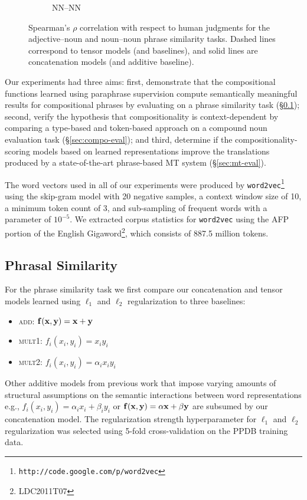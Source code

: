 \documentclass[11pt,letterpaper]{article}
\newcommand{\bX}{{\bf x}}
\newcommand{\bY}{{\bf y}}
\newcommand{\bF}{{\bf f}}
\begin{document}
\begin{figure}[t!]
\begin{center}
\begin{subfigure}{\columnwidth}
		\caption {\small NN--NN}
		\label{fig:nn_nn_result}
	\end{subfigure}
	\end{center}
	\caption{Spearman's $\rho$ correlation with respect to human judgments for the adjective--noun and noun--noun phrase similarity tasks. Dashed lines correspond to tensor models (and baselines), and solid lines are concatenation models (and additive baseline).}
	\label{fig:correlation}
\end{figure}

Our experiments had three aims: first, demonstrate that the compositional functions learned using paraphrase supervision compute semantically meaningful results for compositional phrases by evaluating on a phrase similarity task (\S\ref{sec:phrasesim-eval}); second, verify the hypothesis that compositionality is context-dependent by comparing a type-based and token-based approach on a compound noun evaluation task (\S\ref{sec:compo-eval}); and third, determine if the compositionality-scoring models based on learned representations improve the translations produced by a state-of-the-art phrase-based MT system (\S\ref{sec:mt-eval}).  

The word vectors used in all of our experiments were produced by \texttt{word2vec}\footnote{\texttt{http://code.google.com/p/word2vec}} using the skip-gram model with 20 negative samples, a context window size of 10, a minimum token count of 3, and sub-sampling of frequent words with a parameter of $10^{-5}$.  
We extracted corpus statistics for \texttt{word2vec} using the AFP portion of the English Gigaword\footnote{LDC2011T07}, which consists of 887.5 million tokens. 

\subsection{Phrasal Similarity}
\label{sec:phrasesim-eval}

For the phrase similarity task we first compare our concatenation and tensor models learned using $\ell_1$ and $\ell_2$ regularization to three baselines:
\begin{itemize}[noitemsep]
	\item \textsc{add}: $\bF(\bX, \bY) = \bX + \bY$
	\item \textsc{mult1}: $f_i(x_i, y_i) = x_i y_i$
	\item \textsc{mult2}: $f_i(x_i, y_i) = \alpha_i x_i y_i$
\end{itemize}
Other additive models from previous work \cite{Mitchell2010,Zanzotto2010,Blacoe2012} that impose varying amounts of structural assumptions on the semantic interactions between word representations e.g., $f_i(x_i, y_i) = \alpha_i x_i + \beta_i y_i$ or $\bF(\bX, \bY) = \alpha\bX + \beta\bY$ are subsumed by our concatenation model. 
The regularization strength hyperparameter for $\ell_1$ and $\ell_2$ regularization was selected using 5-fold cross-validation on the PPDB training data. 
\end{document}
